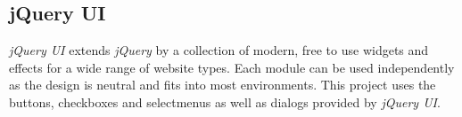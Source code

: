 \subsection{jQuery UI}
\textit{jQuery UI} extends \textit{jQuery} by a collection of modern, free to use widgets and effects for a wide range of website types. Each module can be used independently as the design is neutral and fits into most environments. This project uses the buttons, checkboxes and selectmenus as well as dialogs provided by \textit{jQuery UI}.

\clearpage
